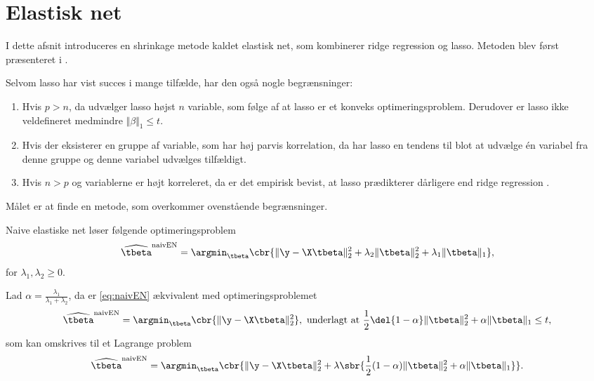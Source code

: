 \section{Elastisk net}
I dette afsnit introduceres en shrinkage metode kaldet elastisk net, som kombinerer ridge regression og lasso.
Metoden blev først præsenteret i \citep{zou_hastie}.

Selvom lasso har vist succes i mange tilfælde, har den også nogle begrænsninger:
%
\begin{enumerate}[label=\textnormal{(\arabic*)}]
    \item Hvis $p>n$, da udvælger lasso højst $n$ variable, som følge af at lasso er et konveks optimeringsproblem. Derudover er lasso ikke veldefineret medmindre \(\Vert \beta \Vert_1 \leq t\). \label{itm:1}
    \item Hvis der eksisterer en gruppe af variable, som har høj parvis korrelation, da har lasso en tendens til blot at udvælge  én variabel fra denne gruppe og denne variabel udvælges tilfældigt. \label{itm:2}
    \item Hvis $n>p$ og variablerne er højt korreleret, da er det empirisk bevist, at lasso prædikterer dårligere end ridge regression \citep{lasso}.  \label{itm:3}
\end{enumerate}
%
Målet er at finde en metode, som overkommer ovenstående begrænsninger.
%
\begin{defn}
Naive elastiske net løser følgende optimeringsproblem
\begin{align}
\widehat{\tbeta}^\text{naivEN} = \argmin_{\tbeta} \cbr{\Vert \y - \X \tbeta \Vert_2^2 + \lambda_2 \Vert \tbeta \Vert_2^2 + \lambda_1 \Vert \tbeta \Vert_1}, \label{eq:naivEN}
\end{align}
for \(\lambda_1, \lambda_2 \geq 0\).
\end{defn}
%
Lad \(\alpha = \frac{\lambda_1}{\lambda_1 + \lambda_2}\), da er \eqref{eq:naivEN} ækvivalent med optimeringsproblemet
\begin{align*}
\widehat{\tbeta}^\text{naivEN} = \argmin_{\tbeta} \cbr{\Vert \y - \X \tbeta \Vert_2^2}, \ \text{underlagt at } \frac{1}{2}\del{1-\alpha} \Vert \tbeta \Vert_2^2 + \alpha \Vert \tbeta \Vert_1 \leq t,
\end{align*}
som kan omskrives til et Lagrange problem
\begin{align}
\widehat{\tbeta}^\text{naivEN} =\argmin_{\tbeta} \cbr{ \Vert \y - \X \tbeta \Vert_2^2 + \lambda \sbr{\frac{1}{2}(1- \alpha) \Vert \tbeta \Vert_2^2 + \alpha \Vert \tbeta \Vert_1}}. \label{eq:4.2}
\end{align}
